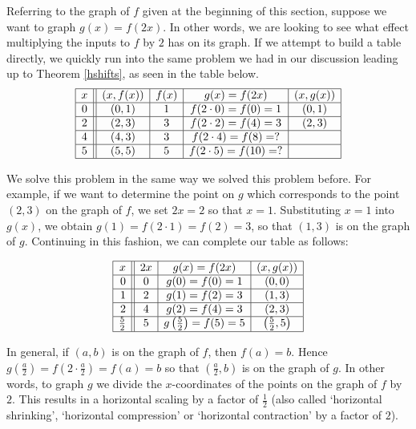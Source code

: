 Referring to the graph of $f$ given at the beginning of this section, suppose we want to graph $g(x) = f(2x)$.  In other words, we are looking to see what effect multiplying the inputs to $f$ by $2$ has on its graph.  If we attempt to build a table directly, we quickly run into the same problem we had in our discussion leading up to Theorem \ref{hshifts}, as seen in the table below.  
\[
\begin{array}{|c||c|c|c|c|}  

\hline

x & (x,f(x)) & f(x)& g(x)=f(2x) & (x, g(x)) \\ \hline
0  & (0,1)& 1 & f(2 \cdot 0) = f(0) = 1   &(0, 1) \\  \hline
2 & (2,3) & 3 & f(2\cdot2) = f(4) = 3  &(2,3) \\  \hline
4 & (4,3) & 3 &  f(2 \cdot 4) = f(8) = ? &  \\  \hline
5 & (5,5) & 5 & f(2 \cdot 5) = f(10) = ?  &  \\  \hline

\end{array}
\]

We solve this problem in the same way we solved this problem before.  For example, if we want to determine the point on $g$ which corresponds to the point $(2,3)$ on the graph of $f$,  we set $2x =2 $ so that $x=1$.  Substituting $x=1$ into $g(x)$, we obtain $g(1) = f(2 \cdot 1) = f(2) = 3$, so that $(1,3)$ is on the graph of $g$. Continuing in this fashion, we can complete our table as follows:   

\smallskip
\[
\begin{array}{|r||c|c|c|}  

\hline

x & 2x & g(x)=f(2x) & (x, g(x)) \\ \hline
0 & 0 & g(0)=f(0) = 1   &(0, 0) \\  \hline
1 &  2 &  g(1)=f(2) = 3  &(1,3) \\  \hline
2 & 4  & g(2)=f(4) = 3 &  (2,3)\\  \hline
\frac{5}{2}  & 5 & g\left(\frac{5}{2}\right)=f(5) = 5  & \left(\frac{5}{2},5\right) \\ [1pt] \hline

\end{array}
\]

\smallskip

In general, if $(a,b)$ is on the graph of $f$, then $f(a) = b$.  Hence $g\left(\frac{a}{2}\right) = f\left(2 \cdot \frac{a}{2}\right) = f(a) = b$ so that $\left(\frac{a}{2}, b\right)$ is on the graph of $g$.  In other words, to graph $g$ we divide the $x$-coordinates of the points on the graph of $f$ by $2$.  This results in a horizontal scaling by a factor of $\frac{1}{2}$ (also called `horizontal shrinking', `horizontal compression' or `horizontal contraction' by a factor of $2$).


